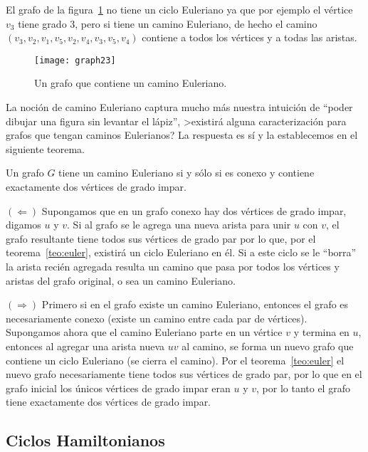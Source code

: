 \begin{ejemplo}
El grafo de la figura~\ref{fig:graph23} no tiene un ciclo Euleriano ya que por ejemplo el vértice $v_3$ tiene grado 3, pero si tiene un camino Euleriano, de hecho el camino $(v_3,v_2,v_1,v_5,v_2,v_4,v_3,v_5,v_4)$ contiene a todos los vértices y a todas las aristas.
\begin{figure}[h!]
\centering
\texttt{[image: graph23]}
\caption{Un grafo que contiene un camino Euleriano.}
\label{fig:graph23}
\end{figure}
\end{ejemplo}

La noción de camino Euleriano captura mucho más nuestra intuición de ``poder dibujar una figura sin levantar el lápiz'', >existirá alguna caracterización para grafos que tengan caminos Eulerianos?
La respuesta es sí y la establecemos en el siguiente teorema.

\begin{teorema}
Un grafo $G$ tiene un camino Euleriano si y sólo si es conexo y contiene exactamente dos vértices de grado impar.

\begin{demostracion}
$(\Leftarrow)$ Supongamos que en un grafo conexo hay dos vértices de grado impar, digamos $u$ y $v$.
Si al grafo se le agrega una nueva arista para unir $u$ con $v$, el grafo resultante tiene todos sus vértices de grado par por lo que, por el teorema~\ref{teo:euler}, existirá un ciclo Euleriano en él.
Si a este ciclo se le ``borra'' la arista recién agregada resulta un camino que pasa por todos los vértices y aristas del grafo original, o sea un camino Euleriano.

$(\Rightarrow)$ 
Primero si en el grafo existe un camino Euleriano, entonces el grafo es necesariamente conexo (existe un camino entre cada par de vértices).
Supongamos ahora que el camino Euleriano parte en un vértice $v$ y termina en $u$, entonces al agregar una arista nueva $uv$ al camino, se forma un nuevo grafo que contiene un ciclo Euleriano (se cierra el camino).
Por el teorema~\ref{teo:euler} el nuevo grafo necesariamente tiene todos sus vértices de grado par, por lo que en el grafo inicial los únicos vértices de grado impar eran $u$ y $v$, por lo tanto el grafo tiene exactamente dos vértices de grado impar.
\end{demostracion}
\end{teorema}

\subsection{Ciclos Hamiltonianos}

